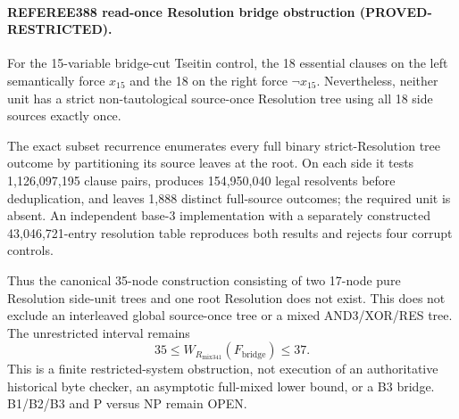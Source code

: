 \paragraph{REFEREE388 read-once Resolution bridge obstruction
(PROVED-RESTRICTED).}
For the 15-variable bridge-cut Tseitin control, the 18 essential clauses on
the left semantically force $x_{15}$ and the 18 on the right force
$\neg x_{15}$.  Nevertheless, neither unit has a strict non-tautological
source-once Resolution tree using all 18 side sources exactly once.

The exact subset recurrence enumerates every full binary strict-Resolution
tree outcome by partitioning its source leaves at the root.  On each side it
tests 1,126,097,195 clause pairs, produces 154,950,040 legal resolvents before
deduplication, and leaves 1,888 distinct full-source outcomes; the required
unit is absent.  An independent base-3 implementation with a separately
constructed 43,046,721-entry resolution table reproduces both results and
rejects four corrupt controls.

Thus the canonical 35-node construction consisting of two 17-node pure
Resolution side-unit trees and one root Resolution does not exist.  This
does not exclude an interleaved global source-once tree or a mixed
AND3/XOR/RES tree.  The unrestricted interval remains
\[
 35\le W_{R_{\mathrm{mix341}}}(F_{\mathrm{bridge}})\le37.
\]
This is a finite restricted-system obstruction, not execution of an
authoritative historical byte checker, an asymptotic full-mixed lower bound,
or a B3 bridge.  B1/B2/B3 and P versus NP remain OPEN.
